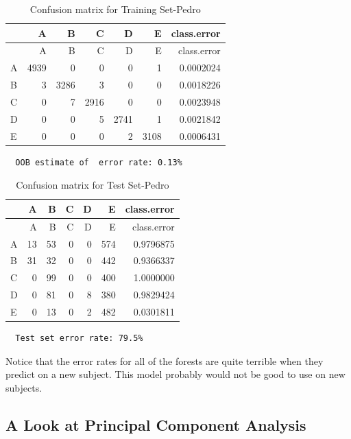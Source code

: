 \documentclass[12pt,twoside]{reedthesis}
\begin{document}
  \newpage
  
  \begin{longtable}[c]{@{}lrrrrrr@{}}
  \caption{Confusion matrix for Training Set-Pedro}\tabularnewline
  \toprule
  & A & B & C & D & E & class.error\tabularnewline
  \midrule
  \endfirsthead
  \toprule
  & A & B & C & D & E & class.error\tabularnewline
  \midrule
  \endhead
  A & 4939 & 0 & 0 & 0 & 1 & 0.0002024\tabularnewline
  B & 3 & 3286 & 3 & 0 & 0 & 0.0018226\tabularnewline
  C & 0 & 7 & 2916 & 0 & 0 & 0.0023948\tabularnewline
  D & 0 & 0 & 5 & 2741 & 1 & 0.0021842\tabularnewline
  E & 0 & 0 & 0 & 2 & 3108 & 0.0006431\tabularnewline
  \bottomrule
  \end{longtable}
  
  \begin{verbatim}
  OOB estimate of  error rate: 0.13%
  \end{verbatim}
  
  \begin{longtable}[c]{@{}lrrrrrr@{}}
  \caption{Confusion matrix for Test Set-Pedro}\tabularnewline
  \toprule
  & A & B & C & D & E & class.error\tabularnewline
  \midrule
  \endfirsthead
  \toprule
  & A & B & C & D & E & class.error\tabularnewline
  \midrule
  \endhead
  A & 13 & 53 & 0 & 0 & 574 & 0.9796875\tabularnewline
  B & 31 & 32 & 0 & 0 & 442 & 0.9366337\tabularnewline
  C & 0 & 99 & 0 & 0 & 400 & 1.0000000\tabularnewline
  D & 0 & 81 & 0 & 8 & 380 & 0.9829424\tabularnewline
  E & 0 & 13 & 0 & 2 & 482 & 0.0301811\tabularnewline
  \bottomrule
  \end{longtable}
  
  \begin{verbatim}
  Test set error rate: 79.5%
  \end{verbatim}
  
  Notice that the error rates for all of the forests are quite terrible
  when they predict on a new subject. This model probably would not be
  good to use on new subjects.
  
  \subsection{A Look at Principal Component
  Analysis}\label{a-look-at-principal-component-analysis}
  
\end{document}
